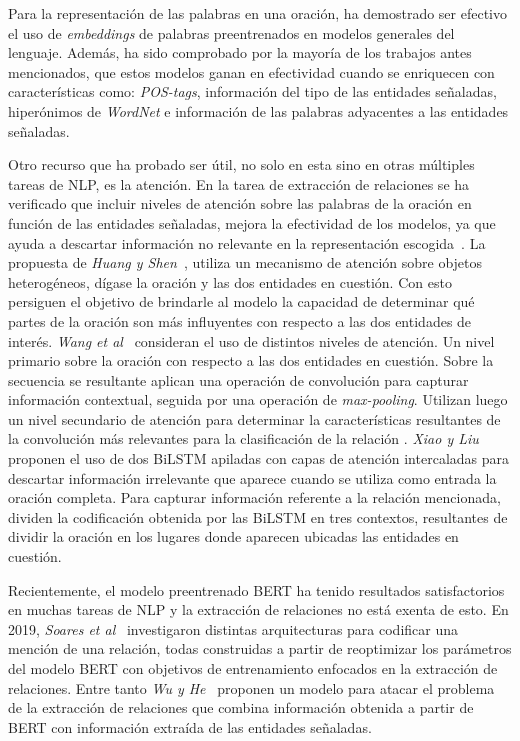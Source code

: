 Para la representación de las palabras en una oración, ha demostrado ser efectivo el uso de \textit{embeddings} de palabras preentrenados en modelos generales del lenguaje.
Además, ha sido comprobado por la mayoría de los trabajos antes mencionados, que estos modelos ganan en efectividad cuando se enriquecen con características como: \textit{POS-tags}, información del tipo de las entidades señaladas, hiperónimos de \textit{WordNet} e información de las palabras adyacentes a las entidades señaladas.

Otro recurso que ha probado ser útil, no solo en esta sino en otras múltiples tareas de NLP, es la atención. 
En la tarea de extracción de relaciones se ha verificado que incluir niveles de atención sobre las palabras de la oración en función de las entidades señaladas, mejora la efectividad de los modelos, ya que ayuda a descartar información no relevante en la representación escogida~\cite{huang2016attention, wang2016relation, xiao2016semantic, lee2019semantic}.
La propuesta de \textit{Huang y Shen}~\cite{huang2016attention}, utiliza un mecanismo de atención sobre objetos heterogéneos, dígase la oración y las dos entidades en cuestión.
Con esto persiguen el objetivo de brindarle al modelo la capacidad de determinar qué partes de la oración son más influyentes con respecto a las dos entidades de interés.
\textit{Wang et al}~\cite{wang2016relation} consideran el uso de distintos niveles de atención.
Un nivel primario sobre la oración con respecto a las dos entidades en cuestión.
Sobre la secuencia se resultante aplican una operación de convolución para capturar información contextual, seguida por una operación de \textit{max-pooling}.
Utilizan luego un nivel secundario de atención para determinar la características resultantes de la convolución más relevantes para la clasificación de la relación .
\textit{Xiao y Liu}~\cite{xiao2016semantic} proponen el uso de dos BiLSTM apiladas con capas de atención intercaladas para descartar información irrelevante que aparece cuando se utiliza como entrada la oración completa.
Para capturar información referente a la relación mencionada, dividen la codificación obtenida por las BiLSTM en tres contextos, resultantes de dividir la oración en los lugares donde aparecen ubicadas las entidades en cuestión.

Recientemente, el modelo preentrenado BERT ha tenido resultados satisfactorios en muchas tareas de NLP y la extracción de relaciones no está exenta de esto.
En 2019, \textit{Soares et al}~\cite{soares2019matching} investigaron distintas arquitecturas para codificar una mención de una relación, todas construidas a partir de reoptimizar los parámetros del modelo BERT con objetivos de entrenamiento enfocados en la extracción de relaciones. 
Entre tanto \textit{Wu y He}~\cite{wu2019enriching} proponen un modelo para atacar el problema de la extracción de relaciones que combina información obtenida a partir de BERT con información extraída de las entidades señaladas.

